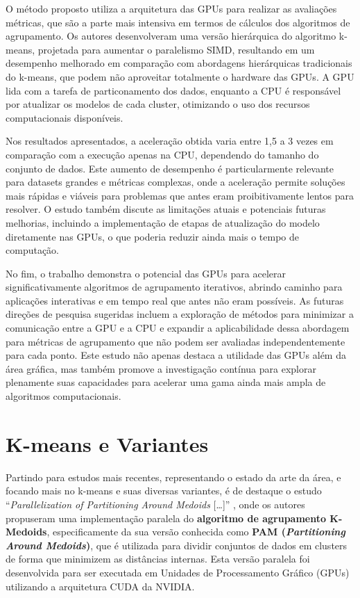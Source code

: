 \documentclass[12pt,
openright, 
oneside, %
a4paper,    %
brazil]{facom-ufu-abntex2}
\begin{document}
O método proposto utiliza a arquitetura das GPUs para realizar as avaliações métricas, que são a parte mais intensiva em termos de cálculos dos algoritmos de agrupamento. Os autores desenvolveram uma versão hierárquica do algoritmo k-means, projetada para aumentar o paralelismo SIMD, resultando em um desempenho melhorado em comparação com abordagens hierárquicas tradicionais do k-means, que podem não aproveitar totalmente o hardware das GPUs. A GPU lida com a tarefa de particonamento dos dados, enquanto a CPU é responsável por atualizar os modelos de cada cluster, otimizando o uso dos recursos computacionais disponíveis.

Nos resultados apresentados, a aceleração obtida varia entre 1,5 a 3 vezes em comparação com a execução apenas na CPU, dependendo do tamanho do conjunto de dados. Este aumento de desempenho é particularmente relevante para datasets grandes e métricas complexas, onde a aceleração permite soluções mais rápidas e viáveis para problemas que antes eram proibitivamente lentos para resolver. O estudo também discute as limitações atuais e potenciais futuras melhorias, incluindo a implementação de etapas de atualização do modelo diretamente nas GPUs, o que poderia reduzir ainda mais o tempo de computação.

No fim, o trabalho demonstra o potencial das GPUs para acelerar significativamente algoritmos de agrupamento iterativos, abrindo caminho para aplicações interativas e em tempo real que antes não eram possíveis. As futuras direções de pesquisa sugeridas incluem a exploração de métodos para minimizar a comunicação entre a GPU e a CPU e expandir a aplicabilidade dessa abordagem para métricas de agrupamento que não podem ser avaliadas independentemente para cada ponto. Este estudo não apenas destaca a utilidade das GPUs além da área gráfica, mas também promove a investigação contínua para explorar plenamente suas capacidades para acelerar uma gama ainda mais ampla de algoritmos computacionais.



\section{K-means e Variantes}

Partindo para estudos mais recentes, representando o estado da arte da área, e focando mais no k-means e suas diversas variantes, é de destaque o estudo \enquote{\textit{Parallelization of Partitioning Around Medoids} [\dots]} \cite{pamKMedoids2020}, onde os autores propuseram uma implementação paralela do \textbf{algoritmo de agrupamento K-Medoids}, especificamente da sua versão conhecida como \textbf{PAM (\textit{Partitioning Around Medoids})}, que é utilizada para dividir conjuntos de dados em clusters de forma que minimizem as distâncias internas. Esta versão paralela foi desenvolvida para ser executada em Unidades de Processamento Gráfico (GPUs) utilizando a arquitetura CUDA da NVIDIA.
\end{document}
